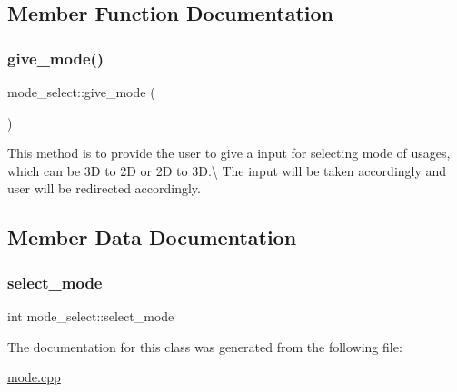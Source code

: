 \subsection{Member Function Documentation}
\mbox{\label{classmode__select_ad2fbf5488edaa41ff5ab4cbf85e6457a}} 
\subsubsection{\texorpdfstring{give\+\_\+mode()}{give\_mode()}}
{\footnotesize\ttfamily mode\+\_\+select\+::give\+\_\+mode (\begin{DoxyParamCaption}{ }\end{DoxyParamCaption})\hspace{0.3cm}{\ttfamily [inline]}}

This method is to provide the user to give a input for selecting mode of usages, which can be 3D to 2D or 2D to 3D.\textbackslash{} The input will be taken accordingly and user will be redirected accordingly.

\subsection{Member Data Documentation}
\mbox{\label{classmode__select_a81b7b37bc5dd126aae4ac9a08270d13a}} 
\subsubsection{\texorpdfstring{select\+\_\+mode}{select\_mode}}
{\footnotesize\ttfamily int mode\+\_\+select\+::select\+\_\+mode}



The documentation for this class was generated from the following file\+:\begin{DoxyCompactItemize}
\item 
\hyperlink{mode_8cpp}{mode.\+cpp}\end{DoxyCompactItemize}
